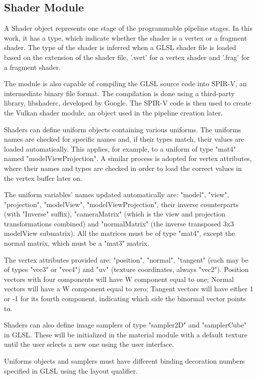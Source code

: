 \subsection{Shader Module}
A Shader object represents one stage of the programmable pipeline stages. In this work, it has a type, which indicate whether the shader is a vertex or a fragment shader. The type of the shader is inferred when a GLSL shader file is loaded based on the extension of the shader file, '.vert' for a vertex shader and '.frag' for a fragment shader.

The module is also capable of compiling the GLSL source code into SPIR-V, an intermediate binary file format. The compilation is done using a third-party library, libshaderc, developed by Google. The SPIR-V code is then used to create the Vulkan shader module, an object used in the pipeline creation later.

Shaders can define uniform objects containing various uniforms. The uniforms names are checked for specific names and, if their types match, their values are loaded automatically. This applies, for example, to a uniform of type "mat4" named "modelViewProjection". A similar process is adopted for vertex attributes, where their names and types are checked in order to load the correct values in the vertex buffer later on.

The uniform variables' names updated automatically are: "model", "view", "projection", "modelView", "modelViewProjection", their inverse counterparts (with "Inverse" suffix), "cameraMatrix" (which is the view and projection transformations combined) and "normalMatrix" (the inverse transposed 3x3 modelView submatrix). All the matrices must be of type "mat4", except the normal matrix, which must be a "mat3" matrix.

The vertex attributes provided are: "position", "normal", "tangent" (each may be of types "vec3" or "vec4") and "uv" (texture coordinates, always "vec2"). Position vectors with four components will have W component equal to one; Normal vectors will have a W component equal to zero; Tangent vectors will have either 1 or -1 for its fourth component, indicating which side the binormal vector points to.

Shaders can also define image samplers of type "sampler2D" and "samplerCube" in GLSL. These will be initialized in the material module with a default texture until the user selects a new one using the user interface.

Uniforms objects and samplers must have different binding decoration numbers specified in GLSL using the layout qualifier.

